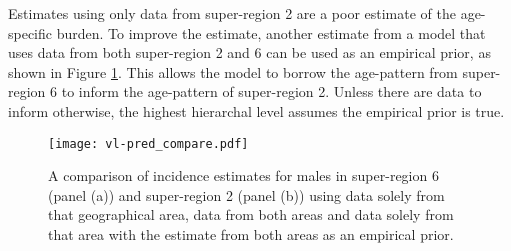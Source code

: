 Estimates using only data from super-region 2 are a poor estimate of the age-specific burden.  To improve the estimate, another estimate from a model that uses data from both super-region 2 and 6 can be used as an empirical prior, as shown in Figure \ref{fig:app-vl pred compare}.  This allows the model to borrow the age-pattern from super-region 6 to inform the age-pattern of super-region 2.  Unless there are data to inform otherwise, the highest hierarchal level assumes the empirical prior is true.

    \begin{figure}[h]
        \begin{center}
            \texttt{[image: vl-pred\_compare.pdf]}
            \caption{A comparison of incidence estimates for males in super-region 6 (panel (a)) and super-region 2 (panel (b)) using data solely from that geographical area, data from both areas and data solely from that area with the estimate from both areas as an empirical prior.}
            \label{fig:app-vl pred compare}
        \end{center}
    \end{figure} 